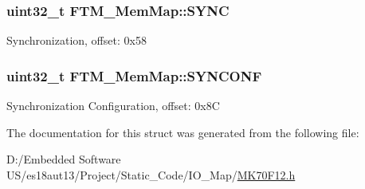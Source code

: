 \subsubsection[{S\+Y\+N\+C}]{\setlength{\rightskip}{0pt plus 5cm}uint32\+\_\+t F\+T\+M\+\_\+\+Mem\+Map\+::\+S\+Y\+N\+C}\label{struct_f_t_m___mem_map_a9537a55fae48de4811bfe7600d37b230}
Synchronization, offset\+: 0x58 \hypertarget{struct_f_t_m___mem_map_a3bd4b174127a80c7f8bd910b66e6de60}{}
\subsubsection[{S\+Y\+N\+C\+O\+N\+F}]{\setlength{\rightskip}{0pt plus 5cm}uint32\+\_\+t F\+T\+M\+\_\+\+Mem\+Map\+::\+S\+Y\+N\+C\+O\+N\+F}\label{struct_f_t_m___mem_map_a3bd4b174127a80c7f8bd910b66e6de60}
Synchronization Configuration, offset\+: 0x8\+C 

The documentation for this struct was generated from the following file\+:\begin{DoxyCompactItemize}
\item 
D\+:/\+Embedded Software U\+S/es18aut13/\+Project/\+Static\+\_\+\+Code/\+I\+O\+\_\+\+Map/\hyperlink{_m_k70_f12_8h}{M\+K70\+F12.\+h}\end{DoxyCompactItemize}
